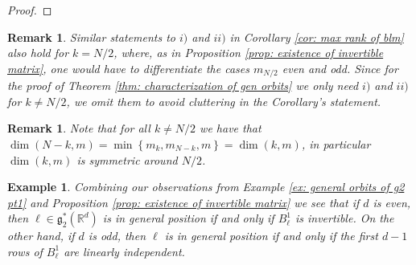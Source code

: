 \documentclass[pdflatex,sn-mathphys-num]{sn-jnl}
\theoremstyle{thmstyletwo}
\theoremstyle{thmstyleone}
\theoremstyle{thmstyletwo}
\newtheorem{example}[definition]{Example}
\newtheorem{remark}[definition]{Remark}
\newcommand{\fancyg}{\mathfrak{g}}
\newcommand{\R}{\mathbb{R}}
\newcommand{\rank}{\operatorname{rank}}
\begin{document}
\begin{proof}
	\end{proof}
	\begin{remark}
		Similar statements to $i)$ and $ii)$ in Corollary \ref{cor: max rank of blm} also hold for $k = N/2$, where, as in Proposition \ref{prop: existence of invertible matrix}, one would have to differentiate the cases $m_{N/2}$ even and odd. Since for the proof of Theorem \ref{thm: characterization of gen orbits} we only need $i)$ and $ii)$ for $k \neq N/2$, we omit them to avoid cluttering in the Corollary's statement.
	\end{remark}
	\begin{remark}
		Note that for all $k\neq N/2$ we have that 
		$\operatorname{dim}(N-k,m) = \min\left\{m_k,m_{N-k},m\right\} = \operatorname{dim}(k,m)$, in particular $\operatorname{dim}(k,m)$ is symmetric around $N/2$.
	\end{remark}
	\begin{example}\label{ex: general orbits of g2 pt2}
		Combining our observations from Example \ref{ex: general orbits of g2 pt1} and Proposition \ref{prop: existence of invertible matrix} we see that if $d$ is even, then $\ell \in \fancyg_2^*(\R^d)$ is in general position if and only if $B_{\ell}^1$ is invertible. On the other hand, if $d$ is odd, then $\ell$ is in general position if and only if the first $d-1$ rows of $B_{\ell}^1$ are linearly independent.
	\end{example}
\end{document}
